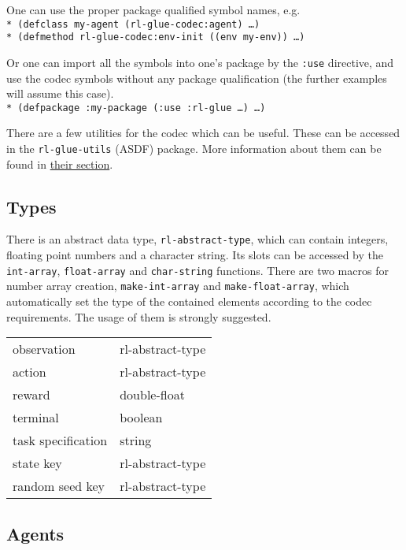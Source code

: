 \documentclass[11pt,a4paper,dvipdfm]{article}
\newcommand{\prompttext}[1]{\texttt{#1}}
\newcommand{\lispprompt}[1]{\prompttext{* #1}}
\begin{document}
One can use the proper package qualified symbol names, e.g. \\
\lispprompt{(defclass my-agent (rl-glue-codec:agent) \ldots)} \\
\lispprompt{(defmethod rl-glue-codec:env-init ((env my-env)) \ldots)}

Or one can import all the symbols into one's package by the \prompttext{:use}
directive, and use the codec symbols without any package qualification
(the further examples will assume this case). \\
\lispprompt{(defpackage :my-package (:use :rl-glue \ldots)~\ldots)}

There are a few utilities for the codec which can be useful. These can be
accessed in the \prompttext{rl-glue-utils} (ASDF) package. More information
about them can be found in \hyperlink{rlutils}{their section}.

\subsection{Types}

There is an abstract data type, \prompttext{rl-abstract-type}, which can
contain integers, floating point numbers and a character string. Its slots can
be accessed by the \prompttext{int-array}, \prompttext{float-array} and
\prompttext{char-string} functions. There are two macros for number array
creation, \prompttext{make-int-array} and \prompttext{make-float-array},
which automatically set the type of the contained elements according to the
codec requirements. The usage of them is strongly suggested.

\begin{center}
\begin{tabular}{ll}
    observation         & rl-abstract-type \\
    action              & rl-abstract-type \\
    reward              & double-float \\
    terminal            & boolean \\
    task specification  & string \\
    state key           & rl-abstract-type \\
    random seed key     & rl-abstract-type \\
\end{tabular}
\end{center}

\subsection{Agents}
\end{document}
